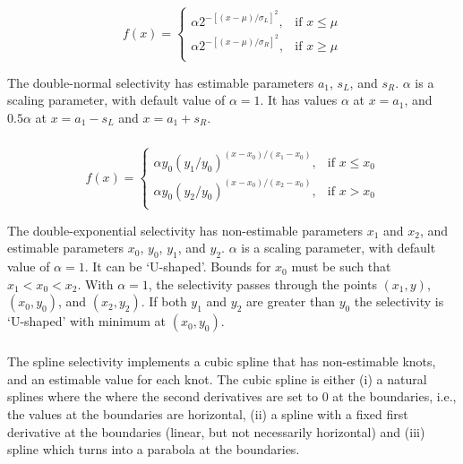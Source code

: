 \subsubsection[Double-normal]{}

\begin{equation}
  f(x) = \begin{cases}
    \alpha 2^{-[(x- \mu)/\sigma_L ]^2}, & \text{if $x \leq \mu$} \\
    \alpha 2^{-[(x- \mu)/\sigma_R ]^2}, & \text{if $x \ge \mu$}\\
  \end{cases}
\end{equation} 

The double-normal selectivity has estimable parameters $a_1$, $s_L$, and $s_R$. $\alpha$ is a scaling parameter, with default value of $\alpha = 1$. It has values $\alpha$ at $x=a_1$, and $0.5 \alpha$ at $x=a_1-s_L$ and $x=a_1+s_R$. 

\subsubsection[Double-exponential]{}

\begin{equation} 
f(x)=\begin{cases}
	  \alpha y_0(y_1 / y_0)^{(x-x_0)/(x_1-x_0)}, & \text{if $x \le x_0$} \\
	  \alpha y_0(y_2 / y_0)^{(x-x_0)/(x_2-x_0)}, & \text{if $x > x_0$} \\
  \end{cases}
\end{equation}

The double-exponential selectivity has non-estimable parameters $x_1$ and $x_2$, and estimable parameters $x_0$, $y_0$, $y_1$, and $y_2$.  $\alpha$ is a scaling parameter, with default value of $\alpha = 1$. It can be `U-shaped'. Bounds for $x_0$ must be such that $x_1 < x_0 < x_2$. With $\alpha=1$, the selectivity passes through the points $(x_1, y)$, $(x_0, y_0)$, and $(x_2, y_2)$. If both $y_1$ and $y_2$ are greater than $y_0$ the selectivity is `U-shaped' with minimum at $(x_0, y_0)$.

\subsubsection[Spline]{}

The spline selectivity implements a cubic spline that has non-estimable knots, and an estimable value for each knot. The cubic spline is either (i) a natural splines where the where the second derivatives are set to 0 at the boundaries, i.e., the values at the boundaries are horizontal, (ii) a spline with a fixed first derivative at the boundaries (linear, but not necessarily horizontal) and (iii) spline which turns into a parabola at the boundaries.







